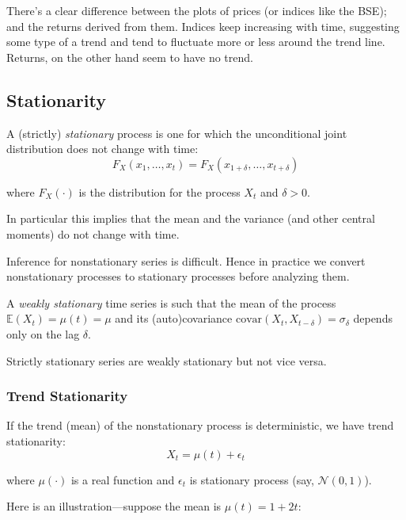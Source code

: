 \documentclass[11pt,]{article}
\begin{document}
There's a clear difference between the plots of prices (or indices like
the BSE); and the returns derived from them. Indices keep increasing
with time, suggesting some type of a trend and tend to fluctuate more or
less around the trend line. Returns, on the other hand seem to have no
trend.

\subsection{Stationarity}\label{stationarity}

A (strictly) \emph{stationary} process is one for which the
unconditional joint distribution does not change with time:
\[F_X(x_1,\hdots,x_t)=F_X(x_{1+\delta},\hdots,x_{t+\delta})\]

where \(F_X(\cdot)\) is the distribution for the process \(X_t\) and
\(\delta>0\).

In particular this implies that the mean and the variance (and other
central moments) do not change with time.

Inference for nonstationary series is difficult. Hence in practice we
convert nonstationary processes to stationary processes before analyzing
them.

A \emph{weakly stationary} time series is such that the mean of the
process \(\mathbb{E}(X_t) = \mu(t) = \mu\) and its (auto)covariance
\(\text{covar}(X_t, X_{t-\delta}) = \sigma_{\delta}\) depends only on
the lag \(\delta\).

Strictly stationary series are weakly stationary but not vice versa.

\subsubsection{Trend Stationarity}\label{trend-stationarity}

If the trend (mean) of the nonstationary process is deterministic, we
have trend stationarity: \[X_t = \mu(t) + \epsilon_t\]

where \(\mu(\cdot)\) is a real function and \(\epsilon_t\) is stationary
process (say, \(\mathcal{N}(0,1)\)).

Here is an illustration---suppose the mean is \(\mu(t) = 1 + 2t\):
\end{document}
